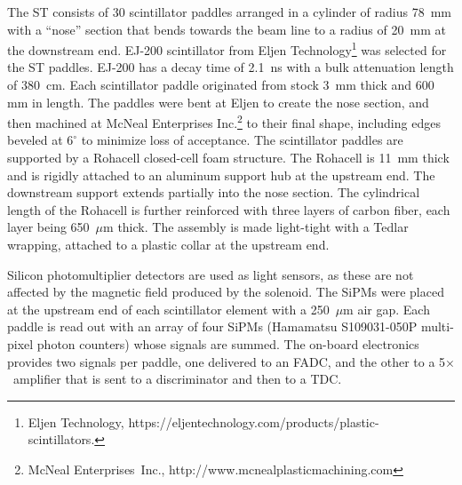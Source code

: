 The ST consists of 30 scintillator paddles arranged in a cylinder of radius 78~mm with a ``nose'' section that bends towards the beam
line to a radius of 20~mm at the downstream end. EJ-200 scintillator from Eljen
Technology\footnote{Eljen Technology, https://eljentechnology.com/products/plastic-scintillators.} was
selected for the ST paddles. EJ-200 has a decay time of 2.1~ns with a bulk attenuation length
of 380~cm. 
Each scintillator paddle originated from stock 3~mm thick and 600 mm in
length. The paddles were bent at Eljen to create the nose section, and then machined at McNeal Enterprises Inc.\footnote{McNeal
  Enterprises~Inc., http://www.mcnealplasticmachining.com} to their
final shape, including edges beveled at $6^\circ$ to minimize loss of
acceptance.
The scintillator paddles are supported by a Rohacell closed-cell foam
structure. The Rohacell is 11~mm thick and is rigidly attached to an
aluminum support hub at the upstream end. The downstream support
extends partially into the nose section. The cylindrical length of the Rohacell is further reinforced with three layers of carbon fiber, each layer being 650~$\mu$m thick. The assembly is made light-tight with a Tedlar wrapping, attached to a plastic collar at the upstream end.

Silicon photomultiplier detectors are used as light
sensors, as these are not affected by the magnetic field produced by the solenoid. The SiPMs were placed
at the upstream end of each scintillator element with a 250~$\mu$m air gap.
Each paddle is read out with an array of four 
SiPMs (Hamamatsu S109031-050P multi-pixel photon counters) whose signals are summed. 
The on-board electronics provides two signals per paddle, one delivered to an FADC, and the other to a 5$\times$~amplifier that is sent to a discriminator and then to a TDC. 

